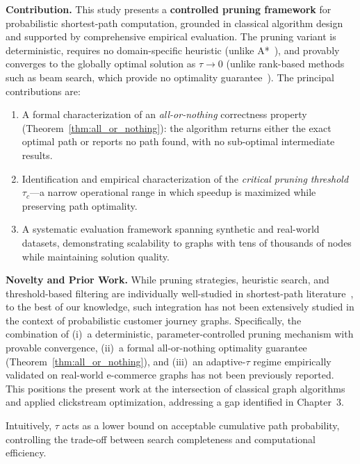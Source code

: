 \noindent\textbf{Contribution.} This study presents a \textbf{controlled pruning framework} for probabilistic shortest-path computation, grounded in classical algorithm design and supported by comprehensive empirical evaluation. The pruning variant is deterministic, requires no domain-specific heuristic (unlike A*~\citep{hart1968astar}), and provably converges to the globally optimal solution as $\tau \to 0$ (unlike rank-based methods such as beam search, which provide no optimality guarantee~\citep{lowerre1976speech,jurafsky2000speech}). The principal contributions are:
\begin{enumerate}
    \item A formal characterization of an \emph{all-or-nothing} correctness property (Theorem~\ref{thm:all_or_nothing}): the algorithm returns either the exact optimal path or reports no path found, with no sub-optimal intermediate results.
    \item Identification and empirical characterization of the \emph{critical pruning threshold}~$\tau_c$---a narrow operational range in which speedup is maximized while preserving path optimality.
    \item A systematic evaluation framework spanning synthetic and real-world datasets, demonstrating scalability to graphs with tens of thousands of nodes while maintaining solution quality.
\end{enumerate}

\medskip
\noindent\textbf{Novelty and Prior Work.} While pruning strategies, heuristic search, and threshold-based filtering are individually well-studied in shortest-path literature~\citep{hart1968astar,pearl1984heuristics,cormen2009}, to the best of our knowledge, such integration has not been extensively studied in the context of probabilistic customer journey graphs. Specifically, the combination of (i)~a deterministic, parameter-controlled pruning mechanism with provable convergence, (ii)~a formal all-or-nothing optimality guarantee (Theorem~\ref{thm:all_or_nothing}), and (iii)~an adaptive-$\tau$ regime empirically validated on real-world e-commerce graphs has not been previously reported. This positions the present work at the intersection of classical graph algorithms and applied clickstream optimization, addressing a gap identified in Chapter~3.

Intuitively, $\tau$ acts as a lower bound on acceptable cumulative path probability, controlling the trade-off between search completeness and computational efficiency.


